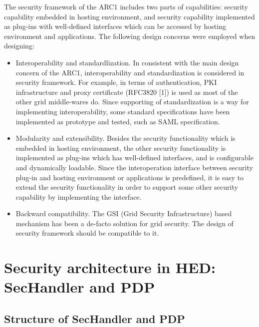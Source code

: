 \documentclass{article}                            %
\begin{document}
The security framework of the ARC1 includes two parts of capabilities: security capability embedded in hosting environment, and security capability implemented as plug-ins with well-defined interfaces which can be accessed by hosting environment and applications. The following design concerns were employed when designing:

\begin{itemize}
    \item Interoperability and standardlization. In consistent with the main design concern of the ARC1, interoperability and standardization is considered in security framework. For example, in terms of authentication, PKI infrastructure and proxy certificate (RFC3820 [1]) is used as most of the other grid middle-wares do. Since supporting of standardization is a way for implementing interoperability, some standard specifications have been implemented as prototype and tested, such as SAML specification.

    \item Modularity and extensibility. Besides the security functionality which is embedded in hosting environment, the other security functionality is implemented as plug-ins which has well-defined interfaces, and is configurable and dynamically loadable. Since the interoperation interface between security plug-in and hosting environment or applications is predefined, it is easy to extend the security functionality in order to support some other security capability by implementing the interface.

    \item Backward compatibility. The GSI (Grid Security Infrastructure) based mechanism has been a de-facto solution for grid security. The design of security framework should be compatible to it.

\end{itemize}


\section{Security architecture in HED: SecHandler and PDP} %
\label{sec:sec_architecture}


\subsection{Structure of SecHandler and PDP} %
\label{subsec:structure_sechandler}
\end{document}

